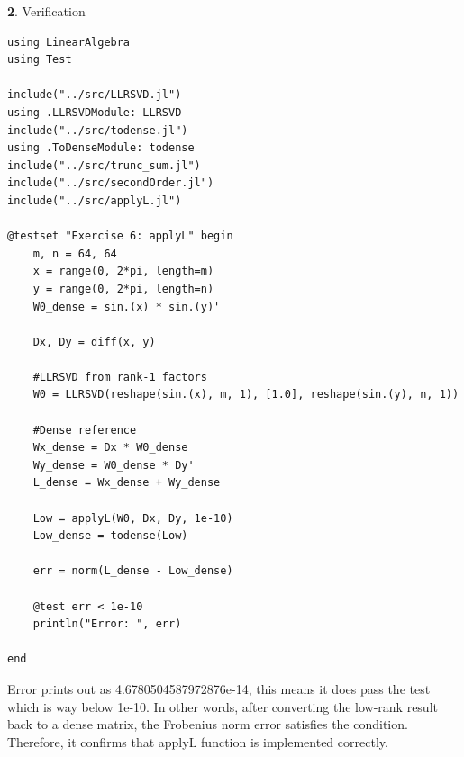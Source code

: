 \documentclass[11pt]{article}
\begin{document}
\textbf{2}. Verification

\begin{lstlisting}
using LinearAlgebra
using Test

include("../src/LLRSVD.jl")
using .LLRSVDModule: LLRSVD
include("../src/todense.jl")
using .ToDenseModule: todense
include("../src/trunc_sum.jl")
include("../src/secondOrder.jl")
include("../src/applyL.jl")

@testset "Exercise 6: applyL" begin
    m, n = 64, 64
    x = range(0, 2*pi, length=m)
    y = range(0, 2*pi, length=n)
    W0_dense = sin.(x) * sin.(y)'

    Dx, Dy = diff(x, y)

    #LLRSVD from rank-1 factors
    W0 = LLRSVD(reshape(sin.(x), m, 1), [1.0], reshape(sin.(y), n, 1))

    #Dense reference
    Wx_dense = Dx * W0_dense
    Wy_dense = W0_dense * Dy'
    L_dense = Wx_dense + Wy_dense

    Low = applyL(W0, Dx, Dy, 1e-10)
    Low_dense = todense(Low)

    err = norm(L_dense - Low_dense)

    @test err < 1e-10
    println("Error: ", err)

end
\end{lstlisting}

Error prints out as 4.6780504587972876e-14, this means it does pass the test which is way below 1e-10. In other words, after converting the low-rank result back to a dense matrix, the Frobenius norm error satisfies the condition. Therefore, it confirms that applyL function is implemented correctly.
\end{document}
